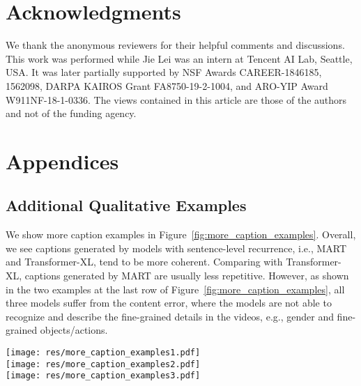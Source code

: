 \documentclass[11pt,a4paper]{article}
\begin{document}
\section*{Acknowledgments}

We thank the anonymous reviewers for their helpful comments and discussions. This work was performed while Jie Lei was an intern at Tencent AI Lab, Seattle, USA. It was later partially supported by NSF Awards CAREER-1846185, 1562098, DARPA KAIROS Grant FA8750-19-2-1004, and ARO-YIP Award W911NF-18-1-0336. The views contained in this article are those of the authors and not of the funding agency.
 



\appendix
\section{Appendices}\label{sec:appendix}



\subsection{Additional Qualitative Examples}
We show more caption examples in Figure~\ref{fig:more_caption_examples}.
Overall, we see captions generated by models with sentence-level recurrence, i.e., MART and Transformer-XL, tend to be more coherent. Comparing with Transformer-XL, captions generated by MART are usually less repetitive. However, as shown in the two examples at the last row of Figure~\ref{fig:more_caption_examples}, all three models suffer from the content error, where the models are not able to recognize and describe the fine-grained details in the videos, e.g., gender and fine-grained objects/actions.

\begin{figure*}[t]
  \centering
  \texttt{[image: res/more\_caption\_examples1.pdf]} \\
  \texttt{[image: res/more\_caption\_examples2.pdf]} \\
  \texttt{[image: res/more\_caption\_examples3.pdf]}
  \caption{Additional qualitative examples. Red/bold indicates pronoun errors (inappropriate use of pronouns or person mentions),  indicates repetitive patterns, underline indicates content errors. Compared to baselines, our model generates more coherent, less repeated paragraphs while maintaining relevance.}
  \label{fig:more_caption_examples}
\end{figure*}
 
\end{document}
